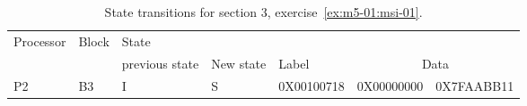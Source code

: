 \begin{table}[htbp]

\begin{tabular}{|l|l|l|l|l|l|l|}

\hline
Processor 	& Block 	& State 	& 		&  		& \multicolumn{2}{c|}{}\\
		&		& previous state	& New state 	& Label	& \multicolumn{2}{c|}{Data}\\
\hline
\hline

P2 & B3 & I & S & 0X00100718 & 0X00000000 & 0X7FAABB11\\
\hline

\end{tabular}

\caption{State transitions for section 3, exercise~\ref{ex:m5-01:msi-01}.}
\label{tab:ex:m5-01:msi-01:4}
\end{table}
